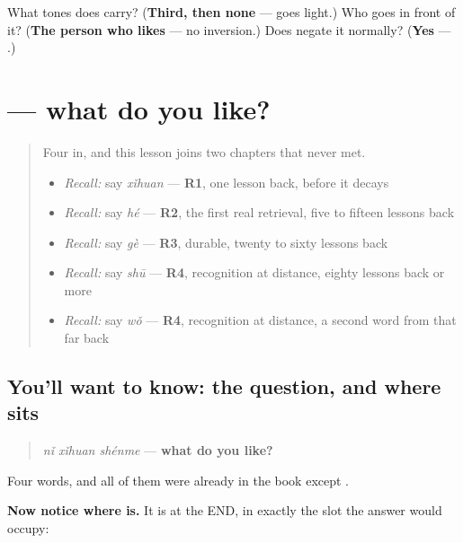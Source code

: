 \begin{tcolorbox}[breakable,colback=teal!4,colframe=teal!35!black,title={Before you move on}]
What tones does  carry? (\textbf{Third, then none} —  goes light.) Who goes in front of it? (\textbf{The person who likes} — no inversion.) Does  negate it normally? (\textbf{Yes} — .)
\end{tcolorbox}
\section[\texorpdfstring{\zh{你喜欢什么} (nǐ xǐhuan shénme)}{你喜欢什么 (nǐ xǐhuan shénme)}]{ — what do you like?}

\label{lesson:ZH-C28-xihuan-shenme}



\begin{quote}
Four in, and this lesson joins two chapters that never met.

\begin{itemize}
\raggedright
  \item \emph{Recall:} say \emph{xǐhuan} — \textbf{R1}, one lesson back, before it decays
  \item \emph{Recall:} say \emph{hé} — \textbf{R2}, the first real retrieval, five to fifteen lessons back
  \item \emph{Recall:} say \emph{gè} — \textbf{R3}, durable, twenty to sixty lessons back
  \item \emph{Recall:} say \emph{shū} — \textbf{R4}, recognition at distance, eighty lessons back or more
  \item \emph{Recall:} say \emph{wǒ} — \textbf{R4}, recognition at distance, a second word from that far back
\end{itemize}
\end{quote}

\subsection*{You'll want to know: the question, and where  sits}
\begin{quote}
\textbf{} \emph{nǐ xǐhuan shénme} — \textbf{what do you like?}
\end{quote}

Four words, and all of them were already in the book except .

\textbf{Now notice where  is.} It is at the END, in exactly the slot the answer would occupy:


